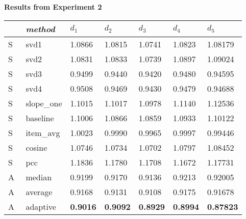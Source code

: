 \begin{table}[p]
  \centering

  \textbf{Results from Experiment 2}

  \vspace{3em}

  \begin{tabular*}{\textwidth}{ l p{3cm} p{1.5cm} p{1.5cm} p{1.5cm} p{1.5cm} p{1.5cm} }
    \toprule
      ~ & \emph{method} & 
      $d_1$ & $d_2$ & $d_3$ & $d_4$ & $d_5$ \\ 
    \midrule
S & svd1       &  1.0866  &  1.0815  &  1.0741  &  1.0823  &  1.08179  \\
S & svd2       &  1.0831  &  1.0833  &  1.0739  &  1.0897  &  1.09024  \\
S & svd3       &  0.9499  &  0.9440  &  0.9420  &  0.9480  &  0.94595  \\
S & svd4       &  0.9508  &  0.9469  &  0.9430  &  0.9479  &  0.94688  \\
S & slope\_one &  1.1015  &  1.1017  &  1.0978  &  1.1140  &  1.12536  \\
S & baseline   &  1.1006  &  1.0866  &  1.0859  &  1.0933  &  1.10122  \\
S & item\_avg  &  1.0023  &  0.9990  &  0.9965  &  0.9997  &  0.99446  \\
S & cosine     &  1.0746  &  1.0734  &  1.0702  &  1.0797  &  1.08452  \\
S & pcc        &  1.1836  &  1.1780  &  1.1708  &  1.1672  &  1.17731  \\
\midrule
A & median     &  0.9199  &  0.9170  &  0.9136  &  0.9213  &  0.92005  \\
A & average    &  0.9168  &  0.9131  &  0.9108  &  0.9175  &  0.91678  \\
A & adaptive    &  \textbf{0.9016}  &  \textbf{0.9092}  &  \textbf{0.8929}  &  \textbf{0.8994}  &  \textbf{0.87823}  \\
    \bottomrule
  \end{tabular*}

  \vspace{3em}


\end{table}
